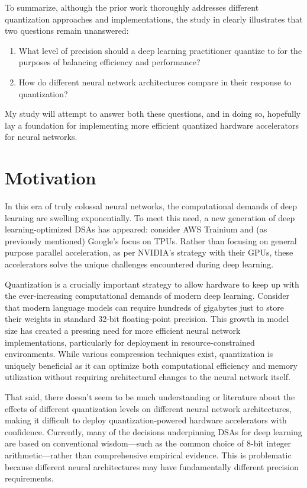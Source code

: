 \documentclass[twocolumn]{article}
\begin{document}
To summarize, although the prior work thoroughly addresses different
quantization approaches and implementations, the study in
\cite{gholami2021survey} clearly illustrates that two questions remain unanswered:
\begin{enumerate}
    \item What level of precision should a deep learning practitioner quantize
    to for the purposes of balancing efficiency and performance?
    \item How do different neural network architectures compare in their
    response to quantization?
\end{enumerate}

My study will attempt to answer both these questions, and in doing so, hopefully
lay a foundation for implementing more efficient quantized hardware accelerators
for neural networks.

\section{Motivation}
In this era of truly colossal neural networks, the computational demands of deep
learning are swelling exponentially. To meet this need, a new generation of deep
learning-optimized DSAs has appeared: consider AWS Trainium and (as previously
mentioned) Google's focus on TPUs. Rather than focusing on general purpose
parallel acceleration, as per NVIDIA's strategy with their GPUs, these
accelerators solve the unique challenges encountered during deep learning.

Quantization is a crucially important strategy to allow hardware to keep up with
the ever-increasing computational demands of modern deep learning. Consider that
modern language models can require hundreds of gigabytes just to store their
weights in standard 32-bit floating-point precision. This growth in model size
has created a pressing need for more efficient neural network implementations,
particularly for deployment in resource-constrained environments. While various
compression techniques exist, quantization is uniquely beneficial as it can
optimize both computational efficiency and memory utilization without requiring
architectural changes to the neural network itself.

That said, there doesn't seem to be much understanding or literature about the
effects of different quantization levels on different neural network
architectures, making it difficult to deploy quantization-powered hardware
accelerators with confidence.  Currently, many of the decisions underpinning
DSAs for deep learning are based on conventional wisdom---such as the common
choice of 8-bit integer arithmetic---rather than comprehensive empirical
evidence. This is problematic because different neural architectures may have
fundamentally different precision requirements. 
\end{document}
